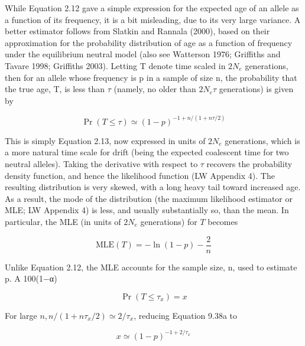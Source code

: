\documentclass{article}
\begin{document}
While Equation 2.12 gave a simple expression for the expected age of an allele as a function of its frequency, it is a bit misleading, due to its very large variance. A better estimator follows from Slatkin and Rannala (2000), based on their approximation for the probability distribution of age as a function of frequency under the equilibrium neutral model (also see Watterson 1976; Griffiths and Tavare 1998; Griffiths 2003). Letting T denote time scaled in  $ 2N_e $ generations, then for an allele whose frequency is p in a sample of size n, the probability that the true age, T, is less than  $ \tau $ (namely, no older than  $ 2N_e\tau $ generations) is given by

\begin{equation}
\Pr(T\leq\tau)\simeq(1-p)^{-1+n/(1+n\tau/2)}
\tag{9.38a}
\label{eq:9_38a}
\end{equation}

This is simply Equation 2.13, now expressed in units of  $ 2N_e $ generations, which is a more natural time scale for drift (being the expected coalescent time for two neutral alleles). Taking the derivative with respect to  $ \tau $ recovers the probability density function, and hence the likelihood function (LW Appendix 4). The resulting distribution is very skewed, with a long heavy tail toward increased age. As a result, the mode of the distribution (the maximum likelihood estimator or MLE; LW Appendix 4) is less, and usually substantially so, than the mean. In particular, the MLE (in units of  $ 2N_e $ generations) for  $ T $ becomes

\begin{equation}
\mathrm{MLE}(T)=-\ln(1-p)-\frac{2}{n}
\tag{9.38b}
\label{eq:9_38b}
\end{equation}

Unlike Equation 2.12, the MLE accounts for the sample size, n, used to estimate p. A 100(1−α)%

\begin{equation}
\Pr(T\leq\tau_{x})=x
\tag{9.38c}
\label{eq:9_38c}
\end{equation}

For large  $ n, n/(1 + n\tau_x/2) \simeq 2/\tau_x $, reducing Equation 9.38a to

\begin{equation}
x\simeq(1-p)^{-1+2/\tau_{x}}
\end{equation}
\end{document}
